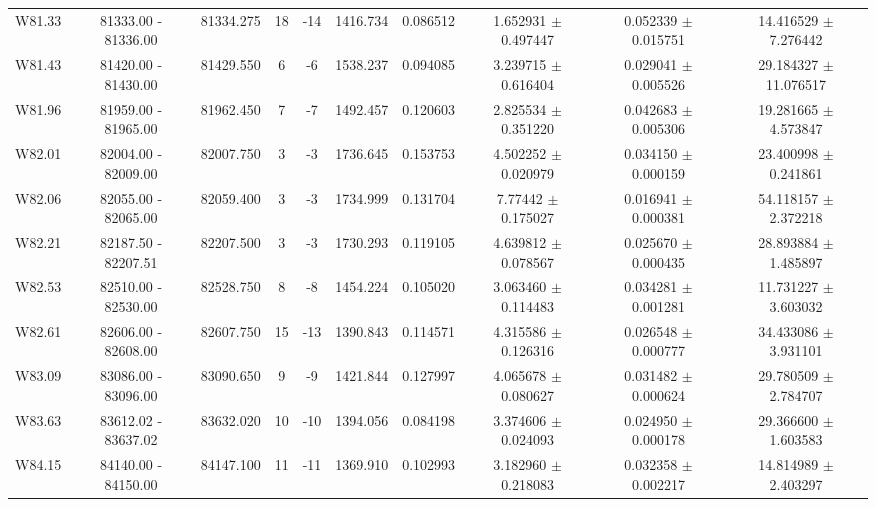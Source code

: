 \documentclass{article}
\begin{document}
\begin{table}[h]
{\begin{tabular}{|c|c|c|c|c|c|c|c|c|c|}
W81.33 & 81333.00 - 81336.00 & 81334.275 & 18 & -14 & 1416.734 & 0.086512 & 1.652931 $\pm$ 0.497447 & 0.052339 $\pm$ 0.015751 & 14.416529 $\pm$ 7.276442 \\

W81.43 & 81420.00 - 81430.00 & 81429.550 & 6 & -6 & 1538.237 & 0.094085 & 3.239715 $\pm$ 0.616404 & 0.029041 $\pm$ 0.005526 & 29.184327 $\pm$ 11.076517 \\

W81.96 & 81959.00 - 81965.00 & 81962.450 & 7 & -7 & 1492.457 & 0.120603 & 2.825534 $\pm$ 0.351220 & 0.042683 $\pm$ 0.005306 & 19.281665 $\pm$ 4.573847 \\

W82.01 & 82004.00 - 82009.00 & 82007.750 & 3 & -3 & 1736.645 & 0.153753 & 4.502252 $\pm$ 0.020979 &  0.034150 $\pm$ 0.000159 & 23.400998 $\pm$ 0.241861 \\

W82.06 & 82055.00 - 82065.00 & 82059.400 & 3 & -3 & 1734.999 & 0.131704 & 7.77442 $\pm$ 0.175027 & 0.016941 $\pm$ 0.000381 & 54.118157 $\pm$ 2.372218 \\

W82.21 & 82187.50 - 82207.51 & 82207.500 & 3 & -3 & 1730.293 & 0.119105 & 4.639812 $\pm$ 0.078567 &  0.025670 $\pm$ 0.000435 & 28.893884 $\pm$ 1.485897 \\
         
W82.53 & 82510.00 - 82530.00 & 82528.750 & 8 & -8 & 1454.224 & 0.105020 & 3.063460 $\pm$ 0.114483 & 0.034281 $\pm$ 0.001281 & 11.731227 $\pm$ 3.603032 \\

W82.61 & 82606.00 - 82608.00 & 82607.750 & 15 & -13 & 1390.843 & 0.114571 & 4.315586 $\pm$ 0.126316 & 0.026548 $\pm$ 0.000777 & 34.433086 $\pm$ 3.931101 \\
         
W83.09 & 83086.00 - 83096.00 & 83090.650 & 9 & -9 & 1421.844 & 0.127997 & 4.065678 $\pm$ 0.080627 & 0.031482 $\pm$ 0.000624 & 29.780509 $\pm$ 2.784707 \\
         
W83.63 & 83612.02 - 83637.02 & 83632.020 & 10 & -10 & 1394.056 & 0.084198 & 3.374606 $\pm$ 0.024093 &  0.024950 $\pm$ 0.000178 & 29.366600 $\pm$ 1.603583 \\
         
W84.15 & 84140.00 - 84150.00 & 84147.100 & 11 & -11 & 1369.910 & 0.102993 & 3.182960 $\pm$ 0.218083 & 0.032358 $\pm$ 0.002217 & 14.814989 $\pm$ 2.403297 \\
         

\end{tabular}}
\end{table}
\end{document}
